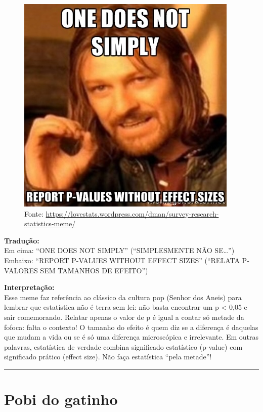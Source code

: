 \documentclass[
]{book}
\begin{document}
\begin{figure}
\centering
\includegraphics{p-value7.jpg}
\caption{Fonte: \url{https://lovestats.wordpress.com/dman/survey-research-statistics-meme/}}
\end{figure}

\textbf{Tradução:}\\
Em cima: ``ONE DOES NOT SIMPLY'' (``SIMPLESMENTE NÃO SE\ldots{}'')
Embaixo: ``REPORT P-VALUES WITHOUT EFFECT SIZES'' (``RELATA P-VALORES SEM TAMANHOS DE EFEITO'')

\textbf{Interpretação:}\\
Esse meme faz referência ao clássico da cultura pop (Senhor dos Aneis) para lembrar que estatística não é terra sem lei: não basta encontrar um p \textless{} 0,05 e sair comemorando. Relatar apenas o valor de p é igual a contar só metade da fofoca: falta o contexto! O tamanho do efeito é quem diz se a diferença é daquelas que mudam a vida ou se é só uma diferença microscópica e irrelevante. Em outras palavras, estatística de verdade combina significado estatístico (p-value) com significado prático (effect size). Não faça estatística ``pela metade''!

\begin{center}\rule{0.5\linewidth}{0.5pt}\end{center}

\section{Pobi do gatinho}\label{pobi-do-gatinho}
\end{document}
